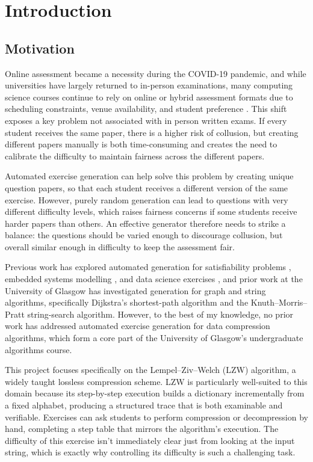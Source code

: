 \documentclass{l4proj}
\begin{document}
\tableofcontents


\chapter{Introduction}
 
\section{Motivation}
 
Online assessment became a necessity during the COVID-19 pandemic, and while universities have largely returned to in-person examinations, many computing science courses continue to rely on online or hybrid assessment formats due to scheduling constraints, venue availability, and student preference \citep{Chirumamilla21}. This shift exposes a key problem not associated with in person written exams. If every student receives the same paper, there is a higher risk of collusion, but creating different papers manually is both time-consuming and creates the need to calibrate the difficulty to maintain fairness across the different papers.
 
Automated exercise generation can help solve this problem by creating unique question papers, so that each student receives a different version of the same exercise. However, purely random generation can lead to questions with very different difficulty levels, which raises fairness concerns if some students receive harder papers than others. An effective generator therefore needs to strike a balance: the questions should be varied enough to discourage collusion, but overall similar enough in difficulty to keep the assessment fair.
 
Previous work has explored automated generation for satisfiability problems \citep{Hoz21}, embedded systems modelling \citep{Sad12}, and data science exercises \citep{Kot19}, and prior work at the University of Glasgow \citep{PriorGlasgow} has investigated generation for graph and string algorithms, specifically Dijkstra's shortest-path algorithm and the Knuth--Morris--Pratt string-search algorithm. However, to the best of my knowledge, no prior work has addressed automated exercise generation for data compression algorithms, which form a core part of the University of Glasgow's undergraduate algorithms course.
 
This project focuses specifically on the Lempel--Ziv--Welch (LZW) algorithm, a widely taught lossless compression scheme. LZW is particularly well-suited to this domain because its step-by-step execution builds a dictionary incrementally from a fixed alphabet, producing a structured trace that is both examinable and verifiable. Exercises can ask students to perform compression or decompression by hand, completing a step table that mirrors the algorithm's execution. The difficulty of this exercise isn’t immediately clear just from looking at the input string, which is exactly why controlling its difficulty is such a challenging task.
 
\end{document}
